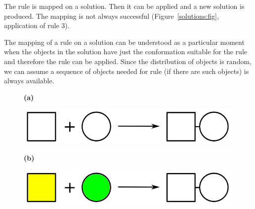 \documentclass[12pt, twoside]{fithesis2} %
\begin{document}
The rule is mapped on a solution. Then it can be applied and a new solution is produced. The mapping is not always successful (Figure~\ref{solutions:fig}, application of rule 3).

The mapping of a rule on a solution can be understood as a particular moment when the objects in the solution have just the conformation suitable for the rule and therefore the rule can be applied. Since the distribution of objects is random, we can assume a sequence of objects needed for rule (if there are such objects) is always available.

\begin{figure}[!h]
\begin{center}
\begin{minipage}[l]{0.1\textwidth}
    \textbf{(a)}
  \end{minipage}
  \begin{minipage}[r]{0.6\textwidth}
    {\hspace*{1.3cm}\includegraphics[scale=0.2]{pics/rule_complex}}
\end{minipage}

\begin{minipage}[l]{0.1\textwidth}
    \textbf{(b)}
  \end{minipage}
  \begin{minipage}[r]{0.6\textwidth}
    {\hspace*{1.3cm}\includegraphics[scale=0.2]{pics/rule_complex_mapped}}
\end{minipage}


\end{center}
\end{figure}
\end{document}
